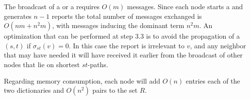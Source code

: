 The broadcast of a \mdisc{} or a \mrep{} requires $O(m)$ messages. Since each node starts a \mdisc{} and generates $n-1$ reports the total number of messages exchanged is $O(nm + n^2m)$, with \mrep{} messages inducing the dominant term $n^2m$. An optimization that can be performed at step 3.3 is to avoid the propagation of a $(s,t)$ \mrep{} if $\sigma_{st}(v) = 0$. In this case the report is irrelevant to $v$, and any neighbor that may have needed it will have received it earlier from the broadcast of other nodes that lie on shortest $st$-paths.

Regarding memory consumption, each node will add $O(n)$ entries each of the two dictionaries and $O(n^2)$ pairs to the set $R$.
